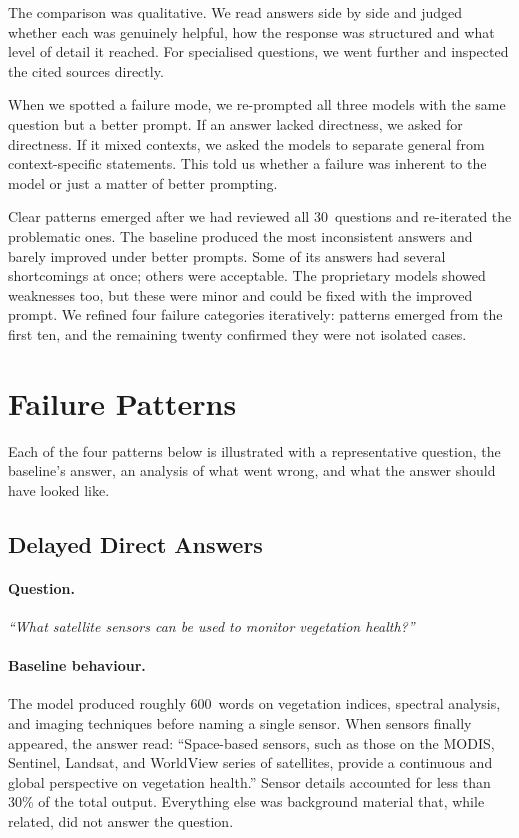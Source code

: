 The comparison was qualitative. We read answers side by side and judged whether each was genuinely helpful, how the response was structured and what level of detail it reached. For specialised questions, we went further and inspected the cited sources directly.

When we spotted a failure mode, we re-prompted all three models with the same question but a better prompt. If an answer lacked directness, we asked for directness. If it mixed contexts, we asked the models to separate general from context-specific statements. This told us whether a failure was inherent to the model or just a matter of better prompting.

Clear patterns emerged after we had reviewed all 30~questions and re-iterated the problematic ones. The baseline produced the most inconsistent answers and barely improved under better prompts. Some of its answers had several shortcomings at once; others were acceptable. The proprietary models showed weaknesses too, but these were minor and could be fixed with the improved prompt. We refined four failure categories iteratively: patterns emerged from the first ten, and the remaining twenty confirmed they were not isolated cases.

\section{Failure Patterns}
\label{sec:failure-patterns}

Each of the four patterns below is illustrated with a representative question, the baseline's answer, an analysis of what went wrong, and what the answer should have looked like.

\subsection{Delayed Direct Answers}
\label{subsec:delayed-answers-example}

\paragraph{Question.} \textit{``What satellite sensors can be used to monitor vegetation health?''}

\paragraph{Baseline behaviour.} The model produced roughly 600~words on vegetation indices, spectral analysis, and imaging techniques before naming a single sensor. When sensors finally appeared, the answer read: ``Space-based sensors, such as those on the MODIS, Sentinel, Landsat, and WorldView series of satellites, provide a continuous and global perspective on vegetation health.'' Sensor details accounted for less than 30\% of the total output. Everything else was background material that, while related, did not answer the question.

